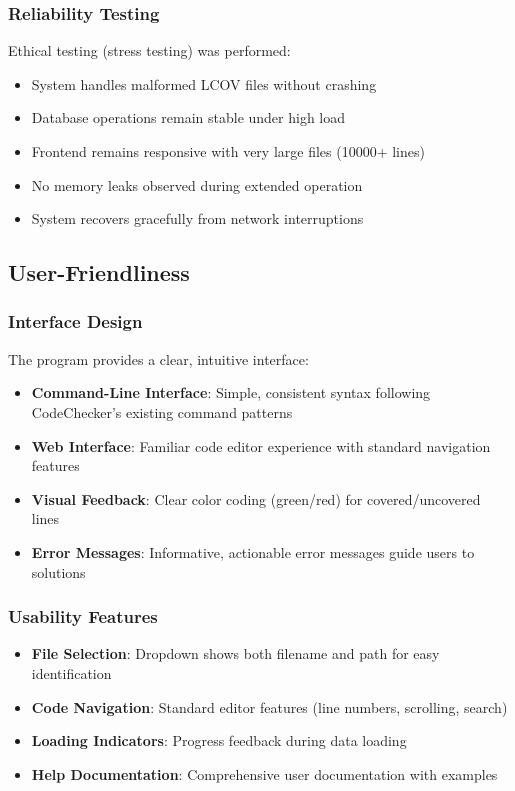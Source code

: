 \subsubsection{Reliability Testing}

Ethical testing (stress testing) was performed:
\begin{itemize}
    \item System handles malformed LCOV files without crashing
    \item Database operations remain stable under high load
    \item Frontend remains responsive with very large files (10000+ lines)
    \item No memory leaks observed during extended operation
    \item System recovers gracefully from network interruptions
\end{itemize}

\subsection{User-Friendliness}

\subsubsection{Interface Design}

The program provides a clear, intuitive interface:

\begin{itemize}
    \item \textbf{Command-Line Interface}: Simple, consistent syntax following CodeChecker's existing command patterns
    \item \textbf{Web Interface}: Familiar code editor experience with standard navigation features
    \item \textbf{Visual Feedback}: Clear color coding (green/red) for covered/uncovered lines
    \item \textbf{Error Messages}: Informative, actionable error messages guide users to solutions
\end{itemize}

\subsubsection{Usability Features}

\begin{itemize}
    \item \textbf{File Selection}: Dropdown shows both filename and path for easy identification
    \item \textbf{Code Navigation}: Standard editor features (line numbers, scrolling, search)
    \item \textbf{Loading Indicators}: Progress feedback during data loading
    \item \textbf{Help Documentation}: Comprehensive user documentation with examples
\end{itemize}

